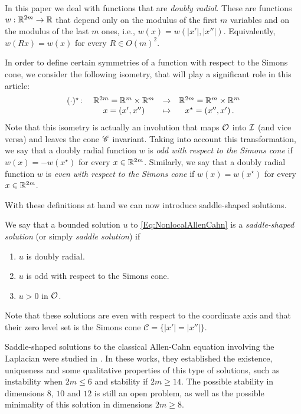 In this paper we deal with functions that are \emph{doubly radial}. These are functions $w:\mathbb{R}^{2m}  \to \mathbb{R}$ that depend only on the modulus of the first $m$ variables and on the modulus of the last $m$ ones, i.e., $w(x) = w(|x'|,|x''|)$. Equivalently, $w(Rx) = w(x)$ for every $R \in O(m)^2$.

In order to define certain symmetries of a function with respect to the Simons cone, we consider the following isometry, that will play a significant role in this article:
\begin{equation}
\label{Eq:DefStar}
\begin{matrix}
(\cdot)^\star \colon & \mathbb{R}^{2m}= \mathbb{R}^{m}\times \mathbb{R}^{m}  &\to&  \mathbb{R}^{2m}= \mathbb{R}^{m}\times \mathbb{R}^{m}  \\
& x = (x',x'') &\mapsto & x^\star = (x'',x')\,.
\end{matrix}
\end{equation}
Note that this isometry is actually an involution that maps $\mathcal{O}$ into $\mathcal{I}$ (and vice versa) and leaves the cone $\mathscr{C}$ invariant. Taking into account this transformation, we say that a doubly radial function $w$ is \emph{odd with respect to the Simons cone} if $w(x) = -w(x^\star)$ for every $x\in \mathbb{R}^{2m}$. Similarly, we say that a doubly radial function $w$ is \emph{even with respect to the Simons cone} if $w(x) = w(x^\star)$ for every $x\in \mathbb{R}^{2m}$.


With these definitions at hand we can now introduce saddle-shaped solutions.
\begin{definition}
	\label{Def:SaddleShapedSol}
	We say that a bounded solution $u$ to \eqref{Eq:NonlocalAllenCahn} is a \emph{saddle-shaped solution} (or simply \emph{saddle solution}) if
	\begin{enumerate}
		\item $u$ is doubly radial.
		\item $u$ is odd with respect to the Simons cone.
		\item $u > 0$ in $\mathcal{O}$.
	\end{enumerate}
\end{definition}
Note that these solutions are even with respect to the coordinate axis and that their zero level set is the Simons cone $\mathscr{C} = \{|x'|=|x''|\}$. 


Saddle-shaped solutions to the classical Allen-Cahn equation involving the Laplacian were studied in \cite{DangFifePeletier, Schatzman, CabreTerraI,CabreTerraII, Cabre-Saddle}. In these works, they established the existence, uniqueness and some qualitative properties of this type of solutions, such as instability when $2m\leq 6$ and stability if $2m\geq 14$. The possible stability in dimensions $8$, $10$ and $12$ is still an open problem, as well as the possible minimality of this solution in dimensions $2m \geq 8$.


